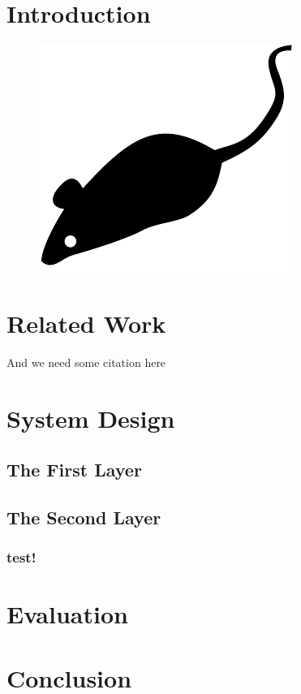 \section{Introduction}
\Blindtext

\begin{figure}[tp]
\centering
\includegraphics{figures/mouse}
\caption{\blindtext}
\end{figure}

\section{Related Work}
\blindtext

And we need some citation here\cite{floyd1993random, stoica2001chord}

\Blindtext

\section{System Design}

\subsection{The First Layer}
\Blindtext

\subsection{The Second Layer}
\Blindtext

\subsubsection{test!}
\Blindtext

\section{Evaluation}
\Blindtext

\section{Conclusion}
\blindtext

